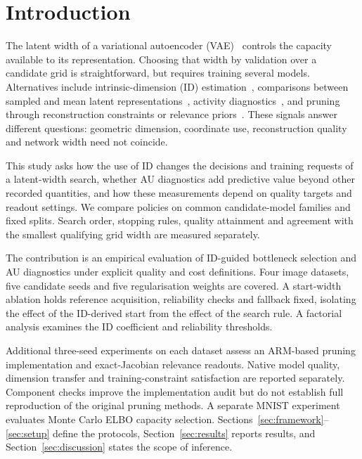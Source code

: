 \documentclass[make,article,submit,pdftex,moreauthors]{Definitions/mdpi}
\begin{document}
\section{Introduction}\label{sec:intro}

The latent width of a variational autoencoder (VAE)~\cite{kingma2014vae}
controls the capacity available to its representation. Choosing that width
by validation over a candidate grid is straightforward, but requires
training several models. Alternatives include intrinsic-dimension (ID)
estimation~\cite{facco2017twonn,levina2005mle}, comparisons between sampled
and mean latent representations~\cite{bonheme2022fondue}, activity
diagnostics~\cite{burda2016iwae,bonheme2023active}, and pruning through
reconstruction constraints or relevance priors~\cite{deboom2020geco,saha2025ardvae}.
These signals answer different questions: geometric dimension, coordinate
use, reconstruction quality and network width need not coincide.

This study asks how the use of ID changes the decisions and training
requests of a latent-width search, whether AU diagnostics add predictive
value beyond other recorded quantities, and how these measurements depend
on quality targets and readout settings. We compare policies on common
candidate-model families and fixed splits. Search order, stopping rules,
quality attainment and agreement with the smallest qualifying grid width
are measured separately.

The contribution is an empirical evaluation of ID-guided bottleneck
selection and AU diagnostics under explicit quality and cost definitions.
Four image datasets, five candidate seeds and five regularisation weights
are covered. A start-width ablation holds reference acquisition,
reliability checks and fallback fixed, isolating the effect of the
ID-derived start from the effect of the search rule. A factorial analysis
examines the ID coefficient and reliability thresholds.

Additional three-seed experiments on each dataset assess an ARM-based
pruning implementation and exact-Jacobian relevance readouts. Native
model quality, dimension transfer and training-constraint satisfaction
are reported separately. Component checks improve the implementation
audit but do not establish full reproduction of the original pruning
methods. A separate MNIST experiment evaluates Monte Carlo ELBO capacity
selection. Sections~\ref{sec:framework}--\ref{sec:setup} define the protocols,
Section~\ref{sec:results} reports results, and
Section~\ref{sec:discussion} states the scope of inference.
\end{document}
